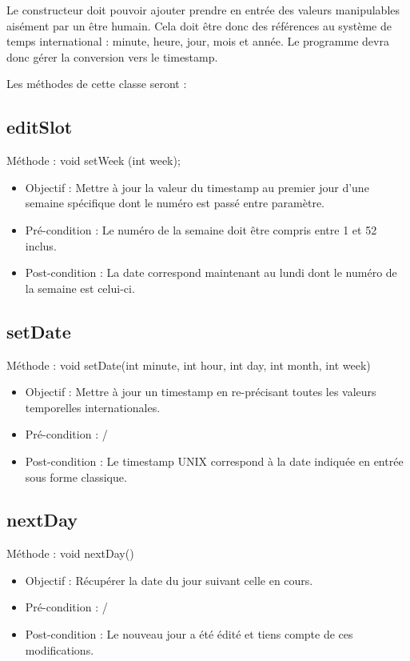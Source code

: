         Le constructeur doit pouvoir ajouter prendre en entrée des valeurs manipulables aisément par un être humain. Cela doit être donc des références au système de temps international : minute, heure, jour, mois et année. Le programme devra donc gérer la conversion vers le timestamp.
        
        Les méthodes de cette classe seront :
   		\subsection*{editSlot}
            Méthode : void setWeek (int week);
			\begin{itemize}
				\item Objectif : Mettre à jour la valeur du timestamp au premier jour d'une semaine spécifique dont le numéro est passé entre paramètre.
				\item Pré-condition : Le numéro de la semaine doit être compris entre 1 et 52 inclus.
				\item Post-condition : La date correspond maintenant au lundi dont le numéro de la semaine est celui-ci.
			\end{itemize}
			
   		\subsection*{setDate}
            Méthode : void setDate(int minute, int hour, int day, int month, int week)
			\begin{itemize}
				\item Objectif : Mettre à jour un timestamp en re-précisant toutes les valeurs temporelles internationales.
				\item Pré-condition : /
				\item Post-condition : Le timestamp UNIX correspond à la date indiquée en entrée sous forme classique.
			\end{itemize}
			
   		\subsection*{nextDay}
            Méthode : void nextDay()
			\begin{itemize}
				\item Objectif : Récupérer la date du jour suivant celle en cours.
				\item Pré-condition : /
				\item Post-condition : Le nouveau jour a été édité et tiens compte de ces modifications.
			\end{itemize}
			
